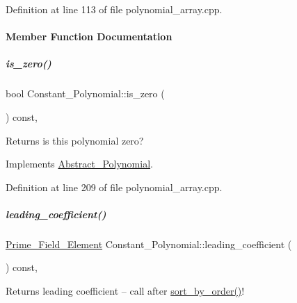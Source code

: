 Definition at line 113 of file polynomial\+\_\+array.\+cpp.



\paragraph{Member Function Documentation}
\mbox{\label{group__polygroup_a14a9a2dbab454f5b20441a51a6000888}} 
\subparagraph{\texorpdfstring{is\+\_\+zero()}{is\_zero()}}
{\footnotesize\ttfamily bool Constant\+\_\+\+Polynomial\+::is\+\_\+zero (\begin{DoxyParamCaption}{ }\end{DoxyParamCaption}) const\hspace{0.3cm}{\ttfamily [override]}, {\ttfamily [virtual]}}

\begin{DoxyReturn}{Returns}
is this polynomial zero? 
\end{DoxyReturn}


Implements \hyperlink{group__polygroup_afb4895702dd56895a792850a831c2f51}{Abstract\+\_\+\+Polynomial}.



Definition at line 209 of file polynomial\+\_\+array.\+cpp.

\mbox{\label{group__polygroup_ab1451de8d6d9f9b0c7df2aef7b32625d}} 
\subparagraph{\texorpdfstring{leading\+\_\+coefficient()}{leading\_coefficient()}}
{\footnotesize\ttfamily \hyperlink{group___fields_group_class_prime___field___element}{Prime\+\_\+\+Field\+\_\+\+Element} Constant\+\_\+\+Polynomial\+::leading\+\_\+coefficient (\begin{DoxyParamCaption}{ }\end{DoxyParamCaption}) const\hspace{0.3cm}{\ttfamily [override]}, {\ttfamily [virtual]}}

\begin{DoxyReturn}{Returns}
leading coefficient -- call after \hyperlink{group__polygroup_a808018b52eca472a7a1b2995e403f35a}{sort\+\_\+by\+\_\+order()}! 
\end{DoxyReturn}


